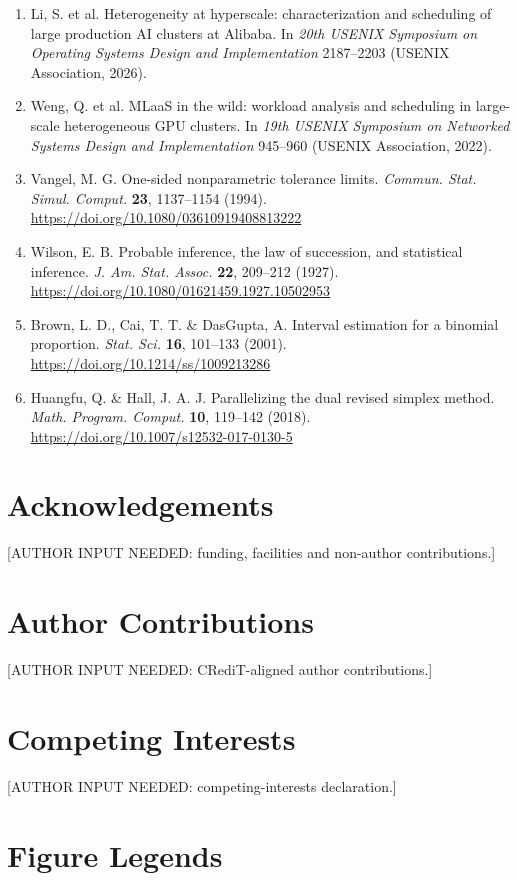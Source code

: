 \documentclass[10pt,a4paper]{article}
\begin{document}
\begin{enumerate}[label=\arabic*.,leftmargin=*,itemsep=4pt]
\item Li, S. et al. Heterogeneity at hyperscale: characterization and scheduling of large production AI clusters at Alibaba. In \emph{20th USENIX Symposium on Operating Systems Design and Implementation} 2187–2203 (USENIX Association, 2026).
\item Weng, Q. et al. MLaaS in the wild: workload analysis and scheduling in large-scale heterogeneous GPU clusters. In \emph{19th USENIX Symposium on Networked Systems Design and Implementation} 945–960 (USENIX Association, 2022).
\item Vangel, M. G. One-sided nonparametric tolerance limits. \emph{Commun. Stat. Simul. Comput.} \textbf{23}, 1137–1154 (1994). \url{https://doi.org/10.1080/03610919408813222}
\item Wilson, E. B. Probable inference, the law of succession, and statistical inference. \emph{J. Am. Stat. Assoc.} \textbf{22}, 209–212 (1927). \url{https://doi.org/10.1080/01621459.1927.10502953}
\item Brown, L. D., Cai, T. T. \& DasGupta, A. Interval estimation for a binomial proportion. \emph{Stat. Sci.} \textbf{16}, 101–133 (2001). \url{https://doi.org/10.1214/ss/1009213286}
\item Huangfu, Q. \& Hall, J. A. J. Parallelizing the dual revised simplex method. \emph{Math. Program. Comput.} \textbf{10}, 119–142 (2018). \url{https://doi.org/10.1007/s12532-017-0130-5}
\end{enumerate}
\section*{Acknowledgements}

[AUTHOR INPUT NEEDED: funding, facilities and non-author contributions.]


\section*{Author Contributions}

[AUTHOR INPUT NEEDED: CRediT-aligned author contributions.]


\section*{Competing Interests}

[AUTHOR INPUT NEEDED: competing-interests declaration.]


\clearpage
\section*{Figure Legends}
\end{document}

